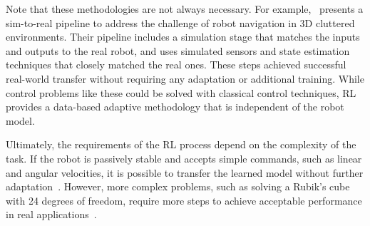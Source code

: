 Note that these methodologies are not always necessary. For example,~\cite{hu2021sim} presents a sim-to-real pipeline to address the challenge of robot navigation in 3D cluttered environments. Their pipeline includes a simulation stage that matches the inputs and outputs to the real robot, and uses simulated sensors and state estimation techniques that closely matched the real ones. These steps achieved successful real-world transfer without requiring any adaptation or additional training. While control problems like these could be solved with classical control techniques, RL provides a data-based adaptive methodology that is independent of the robot model.

Ultimately, the requirements of the RL process depend on the complexity of the task. If the robot is passively stable and accepts simple commands, such as linear and angular velocities, it is possible to transfer the learned model without further adaptation~\cite{hu2021sim}. However, more complex problems, such as solving a Rubik's cube with 24 degrees of freedom, require more steps to achieve acceptable performance in real applications~\cite{akkaya2019solving}. %





